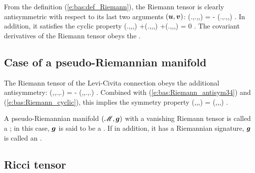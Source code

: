 From the definition (\ref{e:bas:def_Riemann}), the Riemann tensor is
clearly antisymmetric with respect to its last two arguments $(\bm{u},\bm{v})$:
\be \label{e:bas:Riemann_antisym34}
  (.,.,,) = - (.,.,,) .
\ee
In addition, it satisfies the cyclic property
\be \label{e:bas:Riemann_cyclic}
(.,,,)
+(.,,,)
+(.,,,) = 0 .
\ee
The covariant derivatives of the Riemann tensor obeys the 
\be \label{e:bas:Bianchi}
    .
\ee

\subsection{Case of a pseudo-Riemannian manifold}

The Riemann tensor of the Levi-Civita connection obeys the additional antisymmetry:
\be \label{e:bas:Riemann_antisym12}
    (\w{\omega},,.,.)
    = - (,\vw{\omega},.,.) .
\ee
Combined with (\ref{e:bas:Riemann_antisym34}) and (\ref{e:bas:Riemann_cyclic}), this implies
the symmetry property
\be \label{e:bas:Riemann_sym}
  (\w{\omega},,,) =
  (,,\vw{\omega},) .
\ee

A pseudo-Riemannian manifold $(\mathscr{M},\bm{g})$ with a vanishing Riemann tensor is called
a ; in this case, $\bm{g}$ is said to be
a . If in addition, it has a Riemannian signature,
$\bm{g}$ is called an
.

\subsection{Ricci tensor} \label{s:bas:Ricci_tensor}

